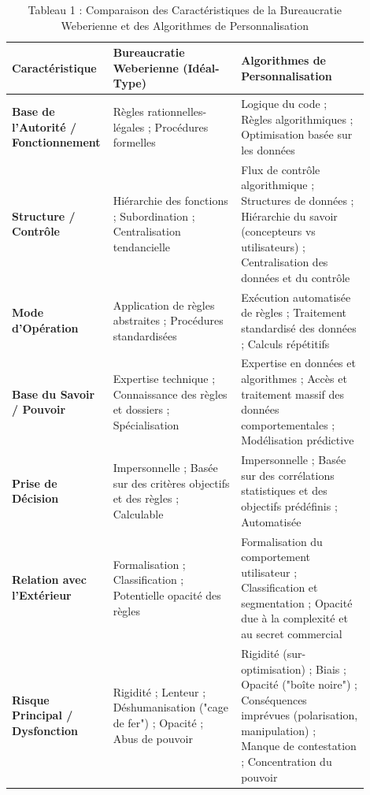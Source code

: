 \documentclass[10pt, twocolumn]{article}
\begin{document}
\begin{table}[ht]
\centering
\caption{Tableau 1 : Comparaison des Caractéristiques de la Bureaucratie Weberienne et des Algorithmes de Personnalisation}
\label{tab:comparison}
\small
\begin{tabular}{@{}p{0.2\linewidth}p{0.35\linewidth}p{0.35\linewidth}@{}}
\toprule
\textbf{Caractéristique} & \textbf{Bureaucratie Weberienne (Idéal-Type)} & \textbf{Algorithmes de Personnalisation} \\
\midrule
\textbf{Base de l'Autorité / Fonctionnement} & Règles rationnelles-légales ; Procédures formelles \citep{Serpa2019, Weber1922} & Logique du code ; Règles algorithmiques ; Optimisation basée sur les données \\
\textbf{Structure / Contrôle} & Hiérarchie des fonctions ; Subordination ; Centralisation tendancielle \citep{Weber1922, Hussain2019} & Flux de contrôle algorithmique ; Structures de données ; Hiérarchie du savoir (concepteurs vs utilisateurs) ; Centralisation des données et du contrôle \\
\textbf{Mode d'Opération} & Application de règles abstraites ; Procédures standardisées \citep{Serpa2019, Weber1922} & Exécution automatisée de règles ; Traitement standardisé des données ; Calculs répétitifs \\
\textbf{Base du Savoir / Pouvoir} & Expertise technique ; Connaissance des règles et dossiers ; Spécialisation \citep{Weber1922, Hussain2019, Jaelani2024} & Expertise en données et algorithmes ; Accès et traitement massif des données comportementales ; Modélisation prédictive \\
\textbf{Prise de Décision} & Impersonnelle ; Basée sur des critères objectifs et des règles ; Calculable \citep{Weber1922, Laguito2024} & Impersonnelle ; Basée sur des corrélations statistiques et des objectifs prédéfinis ; Automatisée \\
\textbf{Relation avec l'Extérieur} & Formalisation ; Classification ; Potentielle opacité des règles \citep{Serpa2019, Weber1922} & Formalisation du comportement utilisateur ; Classification et segmentation ; Opacité due à la complexité et au secret commercial \\
\textbf{Risque Principal / Dysfonction} & Rigidité ; Lenteur ; Déshumanisation ("cage de fer") ; Opacité ; Abus de pouvoir \citep{Serpa2019, Weber1922, Laguito2024, Hussain2019, Jaelani2024} & Rigidité (sur-optimisation) ; Biais ; Opacité ("boîte noire") ; Conséquences imprévues (polarisation, manipulation) ; Manque de contestation ; Concentration du pouvoir \\
\bottomrule
\end{tabular}
\end{table}
\end{document}
